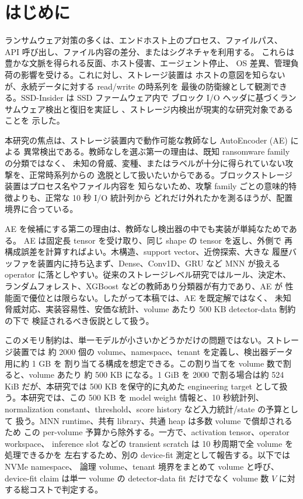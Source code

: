 \section{はじめに}

ランサムウェア対策の多くは、エンドホスト上のプロセス、ファイルパス、
API 呼び出し、ファイル内容の差分、またはシグネチャを利用する。
これらは豊かな文脈を得られる反面、ホスト侵害、エージェント停止、
OS 差異、管理負荷の影響を受ける。これに対し、ストレージ装置は
ホストの意図を知らないが、永続データに対する read/write の時系列を
最後の防衛線として観測できる。SSD-Insider は SSD ファームウェア内で
ブロック I/O ヘッダに基づくランサムウェア検出と復旧を実証し
\cite{baek2018ssdinsider}、ストレージ内検出が現実的な研究対象であることを
示した。

本研究の焦点は、ストレージ装置内で動作可能な教師なし AutoEncoder (AE) による
異常検出である。教師なしを選ぶ第一の理由は、既知 ransomware family の分類ではなく、
未知の脅威、変種、またはラベルが十分に得られていない攻撃を、正常時系列からの
逸脱として扱いたいからである。ブロックストレージ装置はプロセス名やファイル内容を
知らないため、攻撃 family ごとの意味的特徴よりも、正常な 10 秒 I/O 統計列から
どれだけ外れたかを測るほうが、配置境界に合っている。

AE を候補にする第二の理由は、教師なし検出器の中でも実装が単純なためである。
AE は固定長 tensor を受け取り、同じ shape の tensor を返し、外側で
再構成誤差を計算すればよい。木構造、support vector、近傍探索、大きな
履歴バッファを装置内に持ち込まず、Dense、Conv1D、GRU など MNN が扱える
operator に落としやすい。従来のストレージレベル研究ではルール、決定木、
ランダムフォレスト、XGBoost などの教師あり分類器が有力であり、AE が
性能面で優位とは限らない。したがって本稿では、AE を既定解ではなく、
未知脅威対応、実装容易性、安価な統計、volume あたり 500 KB detector-data 制約の下で
検証されるべき仮説として扱う。

このメモリ制約は、単一モデルが小さいかどうかだけの問題ではない。ストレージ装置では
約 2000 個の volume、namespace、tenant を定義し、検出器データ用に約 1 GB を
割り当てる構成を想定できる。この割り当てを volume 数で割ると、volume あたり
約 500 KB になる。1 GiB を 2000 で割る場合は約 524 KiB だが、本研究では
500 KB を保守的に丸めた engineering target として扱う。本研究では、この
500 KB を model weight 情報と、10 秒統計列、
normalization constant、threshold、score history など入力統計/state の予算として
扱う。MNN runtime、共有 library、共通 heap は多数 volume で償却されるため
この per-volume 予算から除外する。一方で、activation tensor、operator workspace、
inference slot などの transient scratch は 10 秒周期で全 volume を処理できるかを
左右するため、別の device-fit 測定として報告する。以下では NVMe namespace、
論理 volume、tenant 境界をまとめて volume と呼び、device-fit claim は単一 volume の
detector-data fit だけでなく volume 数 $V$ に対する総コストで判定する。

